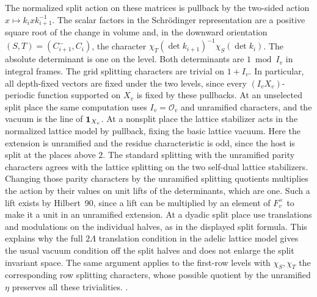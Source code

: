 The normalized split action on these matrices is pullback by the
two-sided action \(x\mapsto k_i x k_{i+1}^{-1}\).
The scalar factors in the Schr\"odinger representation are a positive
square root of the change in volume and, in the downward orientation
\((S,T)=(C_{i+1}^{-},C_i)\), the character
\(\chi_T(\det k_{i+1})^{-1}\chi_S(\det k_i)\).
The absolute determinant is one on the level. Both determinants are
\(1\bmod I_v\) in integral frames. The grid splitting characters
are trivial on \(1+I_v\). In particular, all depth-fixed vectors
are fixed under the two levels, since every
\((I_v X_v)\)-periodic function supported on \(X_v\) is fixed by
these pullbacks. At an unselected split place the same computation
uses \(I_v=\mathcal O_v\) and unramified characters, and the vacuum is
the line of \({\bf1}_{X_v}\). At a nonsplit place the lattice
stabilizer acts in the normalized lattice model by pullback, fixing
the basic lattice vacuum. Here the extension is unramified and the
residue characteristic is odd, since the host is split at the places
above \(2\). The standard splitting with the unramified parity
characters agrees with the lattice splitting on the two self-dual
lattice stabilizers. Changing those parity characters by the
unramified splitting quotients multiplies the action by their
values on unit lifts of the determinants, which are one. Such a
lift exists by Hilbert~90, since a lift can be multiplied by an
element of \(F_v^\times\) to make it a unit in an unramified
extension. At a dyadic split place use translations and modulations
on the individual halves, as in the displayed split formula.
This explains why the full \(2\Lambda\) translation condition in the
adelic lattice model gives the usual vacuum condition off the split
halves and does not enlarge the split invariant space. The same
argument applies to the first-row levels with
\(\chi_S,\chi_T\) the corresponding row splitting characters, whose
possible quotient by the unramified \(\eta\) preserves all these
trivialities.
.

